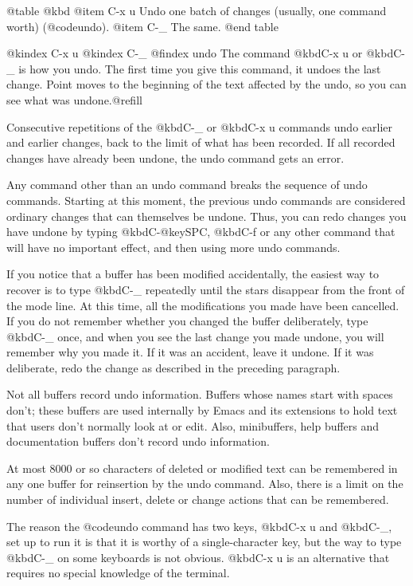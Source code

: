 {{{{{@table @kbd
@item C-x u
Undo one batch of changes (usually, one command worth) (@code{undo}).
@item C-_
The same.
@end table

@kindex C-x u
@kindex C-_
@findex undo
  The command @kbd{C-x u} or @kbd{C-_} is how you undo.  The first
time you give this command, it undoes the last change.  Point moves to
the beginning of the text affected by the undo, so you can see what
was undone.@refill

  Consecutive repetitions of the @kbd{C-_} or @kbd{C-x u} commands undo
earlier and earlier changes, back to the limit of what has been recorded.
If all recorded changes have already been undone, the undo command gets an
error.

  Any command other than an undo command breaks the sequence of undo
commands.  Starting at this moment, the previous undo commands are
considered ordinary changes that can themselves be undone.  Thus, you can
redo changes you have undone by typing @kbd{C-@key{SPC}}, @kbd{C-f} or any
other command that will have no important effect, and then using more undo
commands.

  If you notice that a buffer has been modified accidentally, the easiest
way to recover is to type @kbd{C-_} repeatedly until the stars disappear
from the front of the mode line.  At this time, all the modifications you
made have been cancelled.  If you do not remember whether you changed the
buffer deliberately, type @kbd{C-_} once, and when you see the last change
you made undone, you will remember why you made it.  If it was an accident,
leave it undone.  If it was deliberate, redo the change as described in the
preceding paragraph.

  Not all buffers record undo information.  Buffers whose names start with
spaces don't; these buffers are used internally by Emacs and its extensions
to hold text that users don't normally look at or edit.  Also, minibuffers,
help buffers and documentation buffers don't record undo information.

  At most 8000 or so characters of deleted or modified text can be
remembered in any one buffer for reinsertion by the undo command.  Also,
there is a limit on the number of individual insert, delete or change
actions that can be remembered.

  The reason the @code{undo} command has two keys, @kbd{C-x u} and @kbd{C-_}, set
up to run it is that it is worthy of a single-character key, but the way to
type @kbd{C-_} on some keyboards is not obvious.  @kbd{C-x u} is an
alternative that requires no special knowledge of the terminal.

}}}}}
